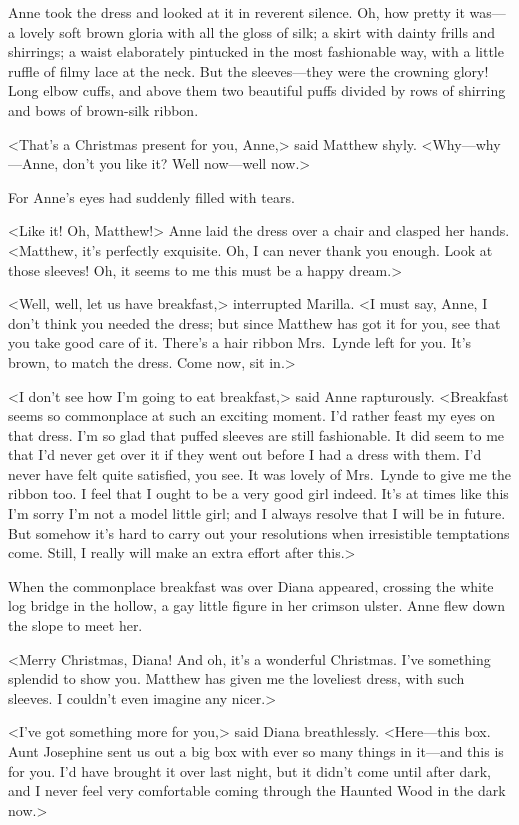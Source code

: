Anne took the dress and looked at it in reverent silence. Oh, how pretty it was—a lovely soft brown gloria with all the gloss of silk; a skirt with dainty frills and shirrings; a waist elaborately pintucked in the most fashionable way, with a little ruffle of filmy lace at the neck. But the sleeves—they were the crowning glory! Long elbow cuffs, and above them two beautiful puffs divided by rows of shirring and bows of brown-silk ribbon.

<That's a Christmas present for you, Anne,> said Matthew shyly. <Why—why—Anne, don't you like it? Well now—well now.>

For Anne's eyes had suddenly filled with tears.

<Like it! Oh, Matthew!> Anne laid the dress over a chair and clasped her hands. <Matthew, it's perfectly exquisite. Oh, I can never thank you enough. Look at those sleeves! Oh, it seems to me this must be a happy dream.>

<Well, well, let us have breakfast,> interrupted Marilla. <I must say, Anne, I don't think you needed the dress; but since Matthew has got it for you, see that you take good care of it. There's a hair ribbon Mrs.~Lynde left for you. It's brown, to match the dress. Come now, sit in.>

<I don't see how I'm going to eat breakfast,> said Anne rapturously. <Breakfast seems so commonplace at such an exciting moment. I'd rather feast my eyes on that dress. I'm so glad that puffed sleeves are still fashionable. It did seem to me that I'd never get over it if they went out before I had a dress with them. I'd never have felt quite satisfied, you see. It was lovely of Mrs.~Lynde to give me the ribbon too. I feel that I ought to be a very good girl indeed. It's at times like this I'm sorry I'm not a model little girl; and I always resolve that I will be in future. But somehow it's hard to carry out your resolutions when irresistible temptations come. Still, I really will make an extra effort after this.>

When the commonplace breakfast was over Diana appeared, crossing the white log bridge in the hollow, a gay little figure in her crimson ulster. Anne flew down the slope to meet her.

<Merry Christmas, Diana! And oh, it's a wonderful Christmas. I've something splendid to show you. Matthew has given me the loveliest dress, with such sleeves. I couldn't even imagine any nicer.>

<I've got something more for you,> said Diana breathlessly. <Here—this box. Aunt Josephine sent us out a big box with ever so many things in it—and this is for you. I'd have brought it over last night, but it didn't come until after dark, and I never feel very comfortable coming through the Haunted Wood in the dark now.>

